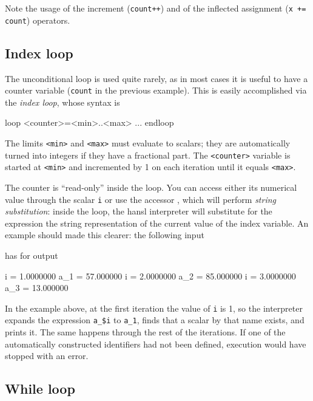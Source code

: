 Note the usage of the increment (\texttt{count++}) and of the
inflected assignment (\texttt{x += count}) operators.

\subsection{Index loop}

The unconditional loop is used quite rarely, as in most cases it is
useful to have a counter variable (\texttt{count} in the previous
example). This is easily accomplished via the \emph{index loop}, whose
syntax is
\begin{code}
loop <counter>=<min>..<max>
   ...
endloop
\end{code}
The limits \texttt{<min>} and \texttt{<max>} must evaluate to scalars;
they are automatically turned into integers if they have a fractional
part. The \texttt{<counter>} variable is started at \texttt{<min>} and
incremented by 1 on each iteration until it equals \texttt{<max>}.

The counter is ``read-only'' inside the loop. You can access either
its numerical value through the scalar \texttt{i} or use the accessor
, which will perform \emph{string substitution}: inside the
loop, the hansl interpreter will substitute for the expression
 the string representation of the current value of the index
variable. An example should made this clearer: the following input
has for output
\begin{code}
    i = 1.0000000
  a_1 = 57.000000
    i = 2.0000000
  a_2 = 85.000000
    i = 3.0000000
  a_3 = 13.000000
\end{code}

In the example above, at the first iteration the value of \texttt{i}
is 1, so the interpreter expands the expression \verb|a_$i| to
\verb|a_1|, finds that a scalar by that name exists, and prints
it. The same happens through the rest of the iterations. If one of the
automatically constructed identifiers had not been defined, execution
would have stopped with an error.

\subsection{While loop}

